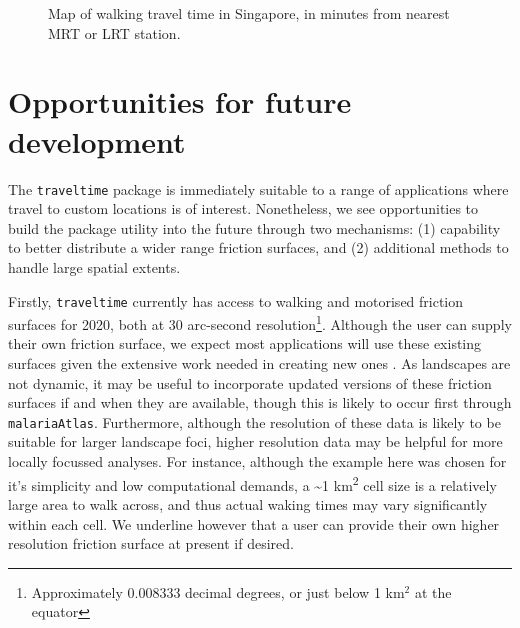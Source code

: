 \documentclass[
  10pt,
  letterpaper,
]{article}
\begin{document}
\begin{figure}


\caption{\label{fig-result}Map of walking travel time in Singapore, in
minutes from nearest MRT or LRT station.}

\end{figure}%

\section{Opportunities for future
development}\label{opportunities-for-future-development}

The \texttt{traveltime} package is immediately suitable to a range of
applications where travel to custom locations is of interest.
Nonetheless, we see opportunities to build the package utility into the
future through two mechanisms: (1) capability to better distribute a
wider range friction surfaces, and (2) additional methods to handle
large spatial extents.

Firstly, \texttt{traveltime} currently has access to walking and
motorised friction surfaces for 2020, both at 30 arc-second
resolution\footnote{Approximately 0.008333 decimal degrees, or just
  below 1 km\(^2\) at the equator}. Although the user can supply their
own friction surface, we expect most applications will use these
existing surfaces given the extensive work needed in creating new ones
\citep{weiss2018global, weiss2020global}. As landscapes are not dynamic,
it may be useful to incorporate updated versions of these friction
surfaces if and when they are available, though this is likely to occur
first through \texttt{malariaAtlas}. Furthermore, although the
resolution of these data is likely to be suitable for larger landscape
foci, higher resolution data may be helpful for more locally focussed
analyses. For instance, although the example here was chosen for it's
simplicity and low computational demands, a \textasciitilde1
km\textsuperscript{2} cell size is a relatively large area to walk
across, and thus actual waking times may vary significantly within each
cell. We underline however that a user can provide their own higher
resolution friction surface at present if desired.
\end{document}
